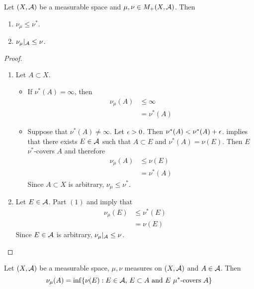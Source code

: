 \documentclass{book}
\begin{document}
	\begin{ex}   
		Let $(X, \mathcal{A})$ be a measurable space and $\mu, \nu \in M_+(X, \mathcal{A})$. Then 
		\begin{enumerate}
			\item $\nu_{\mu} \leq \nu^*$.
			\item $\nu_{\mu}|_{\mathcal{A}} \leq \nu$.
		\end{enumerate}
	\end{ex}

	\begin{proof}\
		\begin{enumerate}
			\item Let $A \subset X$. 
			\begin{itemize}
				\item If $\nu^*(A) = \infty$, then 
				\begin{align*}
					\nu_{\mu}(A)
					& \leq \infty \\
					& = \nu^*(A)
				\end{align*}
				\item Suppose that $\nu^*(A) \neq \infty$. Let $\epsilon > 0$. Then $\nu^*(A) < \nu^*(A) + \epsilon$.  implies that there exists $E \in \mathcal{A}$ such that $A \subset E $ and $\nu^*(A) = \nu(E)$. Then $E$ $\nu^*$-covers $A$ and therefore
				\begin{align*}
					\nu_{\mu}(A)
					& \leq \nu(E) \\
					& = \nu^*(A)
				\end{align*} 
				Since $A \subset X$ is arbitrary, $\nu_{\mu} \leq \nu^*$.
			\end{itemize} 
			\item Let $E \in \mathcal{A}$. Part $(1)$ and  imply that
			\begin{align*}
				\nu_{\mu}(E)
				& \leq \nu^*(E) \\
				& = \nu(E) 
			\end{align*} 
			Since $E \in \mathcal{A}$ is arbitrary, $\nu_{\mu}|_{\mathcal{A}} \leq \nu$.
		\end{enumerate}
	\end{proof}

	\begin{ex}  
		Let $(X, \mathcal{A})$ be a measurable space, $\mu, \nu$ measures on $(X, \mathcal{A})$ and $A \in \mathcal{A}$. Then 
		$$\nu_{\mu}(A) = \inf\{\text{$ \nu(E): E \in \mathcal{A}$, $E \subset A$ and $E$ $\mu^*$-covers $A$} \}$$
	\end{ex}
\end{document}
